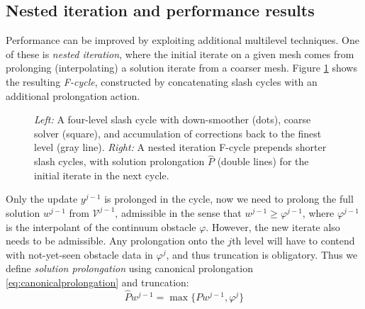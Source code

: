 \documentclass[letterpaper,final,12pt,reqno]{amsart}
\theoremstyle{claim}
\numberwithin{equation}{section}
\numberwithin{figure}{section}
\numberwithin{table}{section}
\numberwithin{theorem}{section}
\begin{document}
\subsection*{Nested iteration and performance results}  Performance can be improved by exploiting additional multilevel techniques.  One of these is \emph{nested iteration}, where the initial iterate on a given mesh comes from prolonging (interpolating) a solution iterate from a coarser mesh.  Figure \ref{fig:fcycle} shows the resulting \emph{F-cycle}, constructed by concatenating slash cycles with an additional prolongation action.

\begin{figure}

\caption{\emph{Left:} A four-level slash cycle with down-smoother (dots), coarse solver (square), and accumulation of corrections back to the finest level (gray line).  \emph{Right:} A nested iteration F-cycle prepends shorter slash cycles, with solution prolongation $\hat P$ (double lines) for the initial iterate in the next cycle.}
\label{fig:fcycle}
\end{figure}

Only the update $y^{j-1}$ is prolonged in the  cycle, now we need to prolong the full solution $w^{j-1}$ from $\mathcal{V}^{j-1}$, admissible in the sense that $w^{j-1} \ge \varphi^{j-1}$, where $\varphi^{j-1}$ is the interpolant of the continuum obstacle $\varphi$.  However, the new iterate also needs to be admissible.  Any prolongation onto the $j$th level will have to contend with not-yet-seen obstacle data in $\varphi^j$, and thus truncation is obligatory.  Thus we define \emph{solution prolongation} using canonical prolongation \eqref{eq:canonicalprolongation} and truncation:
\begin{equation}
\hat P w^{j-1} = \max\{P w^{j-1}, \varphi^{j}\}  \label{eq:solutionprolongation}
\end{equation}
\end{document}
